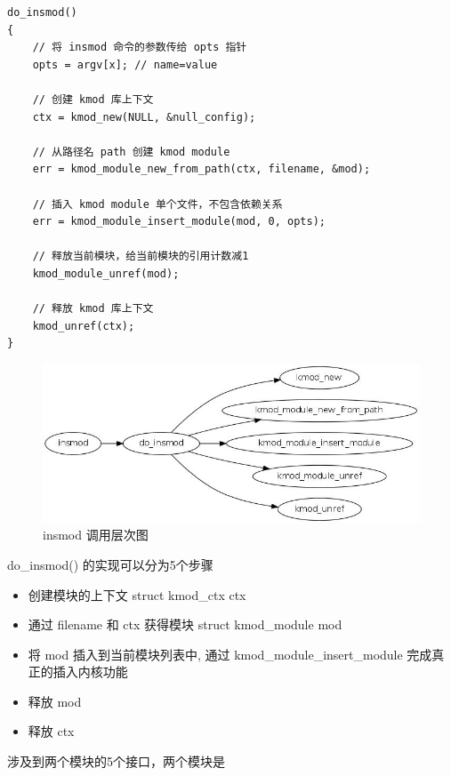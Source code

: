 {\begin{shaded}\begin{verbatim}
do_insmod()
{
    // 将 insmod 命令的参数传给 opts 指针
    opts = argv[x]; // name=value

    // 创建 kmod 库上下文
    ctx = kmod_new(NULL, &null_config);

    // 从路径名 path 创建 kmod module
    err = kmod_module_new_from_path(ctx, filename, &mod);

    // 插入 kmod module 单个文件，不包含依赖关系
    err = kmod_module_insert_module(mod, 0, opts);

    // 释放当前模块，给当前模块的引用计数减1
    kmod_module_unref(mod);

    // 释放 kmod 库上下文
    kmod_unref(ctx);
}
\end{verbatim}\end{shaded}}
\begin{figure}[htbp]
\centering
\includegraphics{./figures/insmod.jpg}
\caption{insmod 调用层次图}
\end{figure}

do\_insmod() 的实现可以分为5个步骤

\begin{itemize}
\item
  创建模块的上下文 struct kmod\_ctx ctx
\item
  通过 filename 和 ctx 获得模块 struct kmod\_module mod
\item
  将 mod 插入到当前模块列表中, 通过 kmod\_module\_insert\_module
  完成真正的插入内核功能
\item
  释放 mod
\item
  释放 ctx
\end{itemize}
涉及到两个模块的5个接口，两个模块是

